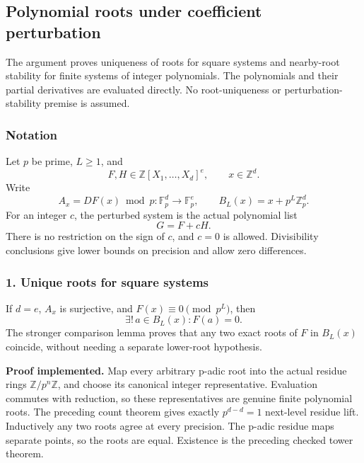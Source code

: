 \hypertarget{cont4:polynomial-roots-under-coefficient-perturbation}{%
\subsection{Polynomial roots under coefficient
perturbation}\label{cont4:polynomial-roots-under-coefficient-perturbation}}

The argument proves uniqueness of roots for square systems and nearby-root stability
for finite systems of integer polynomials. The polynomials and their
partial derivatives are evaluated directly. No root-uniqueness or
perturbation-stability premise is assumed.

\hypertarget{cont4:notation}{%
\subsubsection{Notation}\label{cont4:notation}}

Let \(p\) be prime, \(L\ge1\), and \[
F,H\in\mathbb Z[X_1,\ldots,X_d]^e,
\qquad x\in\mathbb Z^d.
\] Write \[
A_x=DF(x)\bmod p:\mathbb F_p^d\longrightarrow\mathbb F_p^e,
\qquad B_L(x)=x+p^L\mathbb Z_p^d.
\] For an integer \(c\), the perturbed system is the actual polynomial
list \[
G=F+cH.
\] There is no restriction on the sign of \(c\), and \(c=0\) is allowed.
Divisibility conclusions give lower bounds on precision and allow zero
differences.

\hypertarget{cont4:unique-roots-for-square-systems}{%
\subsubsection{1. Unique roots for square
systems}\label{cont4:unique-roots-for-square-systems}}

If \(d=e\), \(A_x\) is surjective, and \(F(x)\equiv0\pmod{p^L}\), then
\[
\boxed{\exists!\,a\in B_L(x):F(a)=0.}
\] The stronger comparison lemma proves that any two exact roots of
\(F\) in \(B_L(x)\) coincide, without needing a separate lower-root
hypothesis.

\textbf{Proof implemented.} Map every arbitrary p-adic root into the
actual residue rings \(\mathbb Z/p^n\mathbb Z\), and choose its
canonical integer representative. Evaluation commutes with reduction, so
these representatives are genuine finite polynomial roots. The preceding
count theorem gives exactly \(p^{d-d}=1\) next-level residue lift.
Inductively any two roots agree at every precision. The p-adic residue
maps separate points, so the roots are equal. Existence is the preceding
checked tower theorem.

